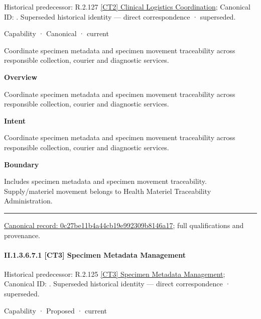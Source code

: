 {\small Historical predecessor: R.2.127 \hyperref[element:90a782ff2d004fa984ae0465528b2253]{[CT2] Clinical Logistics Coordination}; Canonical ID: \texttt{}. Superseded historical identity — direct correspondence · superseded.}\par
\label{element:0c27be11b4a44cb19e992309b8146a17}
{\small Capability · Canonical · current}\par

Coordinate specimen metadata and specimen movement traceability across responsible collection, courier and diagnostic services.



\textbf{Overview}



Coordinate specimen metadata and specimen movement traceability across responsible collection, courier and diagnostic services.



\textbf{Intent}



Coordinate specimen metadata and specimen movement traceability across responsible collection, courier and diagnostic services.



\textbf{Boundary}



Includes specimen metadata and specimen movement traceability. Supply/materiel movement belongs to Health Materiel Traceability Administration.



\medskip\hrule\medskip

{\footnotesize \href{../../../../continuum/strategy/capability/0c27be11b4a44cb19e992309b8146a17.md}{Canonical record: 0c27be11b4a44cb19e992309b8146a17}; full qualifications and provenance.}\par
\paragraph*{II.1.3.6.7.1 [CT3] Specimen Metadata Management}
\label{navigation:II.1.3.6.7.1}

{\small Historical predecessor: R.2.125 \hyperref[element:3b000d3712534d16a48470f79df8e33a]{[CT3] Specimen Metadata Management}; Canonical ID: \texttt{}. Superseded historical identity — direct correspondence · superseded.}\par
\label{element:738736425b7446fdae47b06c91c4f69c}
{\small Capability · Proposed · current}\par

